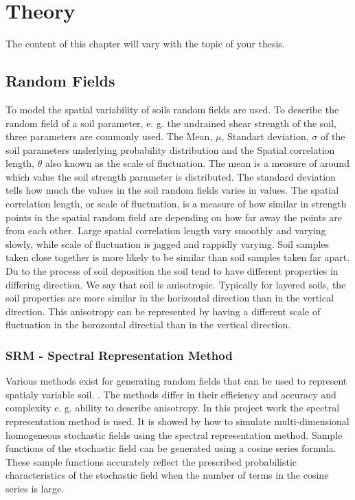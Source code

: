 \chapter[Theory]{Theory}
The content of this chapter will vary with the topic of your thesis. 

\section{Random Fields}

To model the spatial variability of soils random fields are used. To describe the random field of a soil parameter, e. g. the undrained shear strength of the soil, three parameters are commonly used. 
The Mean, $\mu$, Standart deviation, $\sigma$ of the soil parameters underlying probability distribution and the Spatial correlation length, $\theta$ also known as the scale of fluctuation.   
The mean is a measure of around which value the soil strength parameter is distributed. The standard deviation tells how much the values in the soil random fields varies in values. The spatial correlation length, or scale of fluctuation, is a measure of how similar in strength points in the spatial random field are depending on how far away the points are from each other. Large spatial correlation length vary smoothly and varying slowly, while scale of fluctuation is jagged and rappidly varying.
Soil samples taken close together is more likely to be similar than soil samples taken far apart.
Du to the process of soil deposition the soil tend to have different properties in differing direction. We say that soil is anisotropic. Typically for layered soils, the soil properties are more similar in the horizontal direction than in the vertical direction. This anisotropy can be represented by having a different scale of fluctuation in the horozontal directial than in the vertical direction.

\subsection{SRM - Spectral Representation Method}

Various methods exist for generating random fields that can be used to represent spatialy variable soil. \citep*[see e. g.][Chapter 6]{fenton2008risk}. The methods differ in their efficiency and accuracy and complexity e. g. ability to describe anisotropy.
In this project work the spectral representation method is used. It is showed by \citet*{shinozuka1996simulation} how to simulate multi-dimensional homogeneous stochastic fields using the spectral representation method. 
Sample functions of the stochastic field can be generated using a cosine series formula. These sample functions accurately reflect the prescribed probabilistic characteristics of the stochastic field when the number of terms in the cosine series is large.

